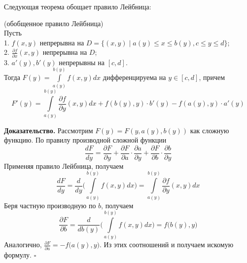 Следующая теорема обощает правило Лейбница:
\begin{theor} (обобщенное правило Лейбница)\\
    Пусть\\
    1. $f(x,y)$ непрерывна на $D=\{(x,y)\mid a(y)\leqslant x\leqslant 
    b(y),c\leqslant y\leqslant d\}$;\\
    2. $\frac{\partial f}{\partial x}(x,y)$ непрерывна на $D$;\\
    3. $a'(y),b'(y)$ непрерывны на  $[c,d]$.\\
    Тогда $F(y)=\int\limits_{a(y)}^{b(y)}f(x,y)dx$ дифференцируема на 
     $y\in[c,d]$, причем  
     $$F'(y)=\int\limits_{a(y)}^{b(y)}\frac{\partial f}{\partial y}(x,y)dx
     +f(b(y),y)\cdot b'(y) - f(a(y),y)\cdot a'(y)$$
\end{theor}
\textbf{Доказательство.}  Рассмотрим $F(y)=F(y,a(y),b(y))$ как сложную
функцию. По правилу производной сложной функции
$$\frac{dF}{dy}=\frac{\partial F}{\partial y}+
\frac{\partial F}{\partial a}\cdot \frac{\partial a}{\partial y} + 
\frac{\partial F}{\partial b}\cdot \frac{\partial b}{\partial y}$$
Применяя правило Лейбница, получаем
$$\frac{dF}{dy} = \frac{d}{dy}\bigg(\int\limits_{a(y)}^{b(y)}f(x,y)dx\bigg) = 
\int\limits_{a(y)}^{b(y)}\frac{\partial f}{\partial y}(x,y)dx$$
Беря частную производную по $b$, получаем
 $$\frac{\partial F}{\partial b} = 
 \frac{d}{db(y)}\bigg(\int\limits_{a(y)}^{b(y)}f(x,y)dx\bigg) = 
 f\big(b(y),y\big)$$
 Аналогично, $\frac{\partial F}{\partial a}=-f\big(a(y),y\big)$. Из этих
 соотношений и получаем искомую формулу. $\square$



